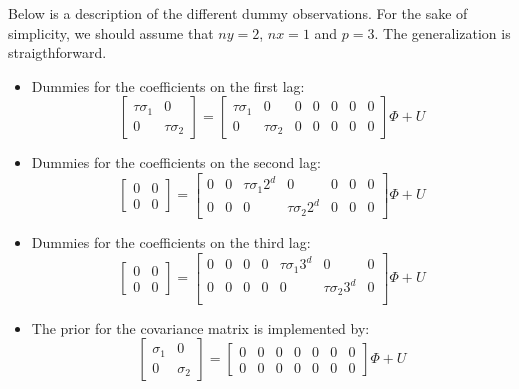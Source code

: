 \documentclass[11pt,a4paper]{article}
\begin{document}
Below is a description of the different dummy observations. For the sake of simplicity, we should assume that $ny = 2$, $nx = 1$ and $p = 3$. The generalization is straigthforward.

\begin{itemize}
\item Dummies for the coefficients on the first lag:
$$\left[
\begin{array}{cc}
\tau\sigma_1 & 0 \\
0 & \tau\sigma_2
\end{array}
\right]
=
\left[
\begin{array}{ccccccc}
\tau\sigma_1 & 0 & 0&0& 0&0& 0 \\
0 & \tau\sigma_2 & 0&0& 0&0& 0
\end{array}
\right]\Phi + U$$

\item Dummies for the coefficients on the second lag:
$$\left[
\begin{array}{cc}
0 & 0 \\
0 & 0
\end{array}
\right]
=
\left[
\begin{array}{ccccccc}
0&0& \tau\sigma_1 2^d & 0 & 0&0& 0 \\
0&0& 0 & \tau\sigma_2 2^d & 0&0& 0
\end{array}
\right]\Phi + U$$

\item Dummies for the coefficients on the third lag:
$$\left[
\begin{array}{cc}
0 & 0 \\
0 & 0
\end{array}
\right]
=
\left[
\begin{array}{ccccccc}
0&0& 0&0& \tau\sigma_1 3^d & 0 & 0 \\
0&0& 0&0& 0 & \tau\sigma_2 3^d & 0 \\
\end{array}
\right]\Phi + U$$

\item The prior for the covariance matrix is implemented by:
$$\left[
\begin{array}{cc}
\sigma_1 & 0 \\
0 & \sigma_2
\end{array}
\right]
=
\left[
\begin{array}{ccccccc}
0&0& 0&0& 0&0& 0 \\
0&0& 0&0& 0&0& 0
\end{array}
\right]\Phi + U$$


\end{itemize}
\end{document}
